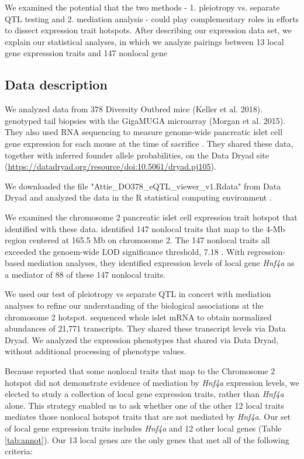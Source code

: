 \documentclass{article}
\begin{document}
We examined the potential that the two methods - 1. pleiotropy vs. separate QTL testing and 2. mediation analysis - could play complementary roles in efforts to dissect expression trait hotspots. After describing our expression data set, we explain our statistical analyses, in which we analyze pairings between 13 local gene expresssion traits and 147 nonlocal gene 


\subsection{Data description}

We analyzed data from 378 Diversity Outbred mice (Keller et al. 2018). \citet{keller2018genetic} genotyped tail biopsies with the GigaMUGA microarray (Morgan et al. 2015). They also used RNA sequencing to measure genome-wide pancreatic islet cell gene expression for each mouse at the time of sacrifice \citep{keller2018genetic}. They shared these data, together with inferred founder allele probabilities, on the Data Dryad site (\url{https://datadryad.org/resource/doi:10.5061/dryad.pj105}). 

We downloaded the file "Attie\_DO378\_eQTL\_viewer\_v1.Rdata" from Data Dryad \citep{keller2018genetic} and analyzed the data in the R statistical computing environment \citep{r}.

We examined the chromosome 2 pancreatic islet cell expression trait hotspot that \citet{keller2018genetic} identified with these data. \citet{keller2018genetic} identified 147 nonlocal traits that map to the 4-Mb region centered at 165.5 Mb on chromosome 2. The 147 nonlocal traits all exceeded the genoem-wide LOD significance threshold, 7.18 \citep{keller2018genetic}. With regression-based mediation analyses, they identified expression levels of local gene \emph{Hnf4a} as a mediator of 88 of these 147 nonlocal traits. 

We used our test of pleiotropy vs separate QTL in concert with mediation analyses to refine our understanding of the biological associations at the chromosome 2 hotspot. \citet{keller2018genetic} sequenced whole islet mRNA to obtain normalized abundances of 21,771 transcripts. They shared these transcript levels via Data Dryad. We analyzed the expression phenotypes that \citet{keller2018genetic} shared via Data Dryad, without additional processing of phenotype values. 



Because \citet{keller2018genetic} reported that some nonlocal traits that map to the Chromosome 2 hotspot did not demonstrate evidence of mediation by \emph{Hnf4a} expression levels, we elected to study a collection of local gene expression traits, rather than \emph{Hnf4a} alone. This strategy enabled us to ask whether one of the other 12 local traits mediates those nonlocal hotspot traits that are not mediated by \emph{Hnf4a}. Our set of local gene expression traits includes \emph{Hnf4a} and 12 other local genes (Table \ref{tab:annot}). Our 13 local genes are the only genes that met all of the following criteria:
\end{document}
